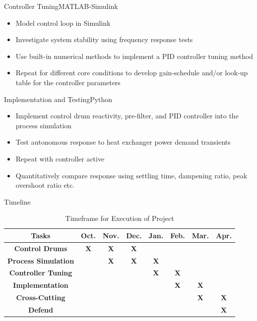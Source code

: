 \documentclass[aspectratio=169,pdftex,dvipsnames]{beamer}
\newcommand{\x}{\cellcolor{lightgray}\textbf{X}} %
\begin{document}
\begin{frame}{Controller Tuning}{MATLAB-Simulink}
    \begin{itemize}
        \item Model control loop in Simulink
        \item Investigate system stability using frequency response tests
        \item Use built-in numerical methods to implement a PID controller tuning method
        \item Repeat for different core conditions to develop gain-schedule and/or look-up table for the controller parameters
    \end{itemize}
\end{frame}

\begin{frame}{Implementation and Testing}{Python}
    \begin{itemize}
        \item Implement control drum reactivity, pre-filter, and PID controller into the process simulation
        \item Test autonomous response to heat exchanger power demand transients
        \item Repeat with controller active
        \item Quantitatively compare response using settling time, dampening ratio, peak overshoot ratio etc.
    \end{itemize}
\end{frame}

\begin{frame}{Timeline}

    \begin{table}
        \centering
        \caption{Timeframe for Execution of Project}
        \begin{tabular}{c|c|c|c|c|c|c|c}
            \textbf{Tasks} & Oct. & Nov. & Dec. & Jan. & Feb. & Mar. & Apr.\\\hline
            \textbf{Control Drums} & \x & \x & \x &  &  &  & \\\hline
            \textbf{Process Simulation} &  & \x & \x & \x &  &  & \\\hline
            \textbf{Controller Tuning} &  &  &  & \x & \x &  & \\\hline
            \textbf{Implementation} &  &  &  &  & \x & \x & \\\hline
            \textbf{Cross-Cutting} &  &  &  &  &  & \x & \x\\\hline
            \textbf{Defend} &  &  &  &  &  &  & \x \\

        \end{tabular}
    \end{table}
        

\end{frame}
\end{document}
